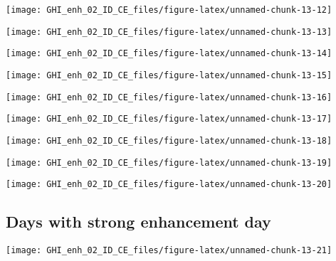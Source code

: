 \documentclass[
  10pt,
  a4paper,oneside]{article}
\begin{document}
\begin{center}\texttt{[image: GHI\_enh\_02\_ID\_CE\_files/figure-latex/unnamed-chunk-13-12]} \end{center}

\begin{center}\texttt{[image: GHI\_enh\_02\_ID\_CE\_files/figure-latex/unnamed-chunk-13-13]} \end{center}

\begin{center}\texttt{[image: GHI\_enh\_02\_ID\_CE\_files/figure-latex/unnamed-chunk-13-14]} \end{center}

\begin{center}\texttt{[image: GHI\_enh\_02\_ID\_CE\_files/figure-latex/unnamed-chunk-13-15]} \end{center}

\begin{center}\texttt{[image: GHI\_enh\_02\_ID\_CE\_files/figure-latex/unnamed-chunk-13-16]} \end{center}

\begin{center}\texttt{[image: GHI\_enh\_02\_ID\_CE\_files/figure-latex/unnamed-chunk-13-17]} \end{center}

\begin{center}\texttt{[image: GHI\_enh\_02\_ID\_CE\_files/figure-latex/unnamed-chunk-13-18]} \end{center}

\begin{center}\texttt{[image: GHI\_enh\_02\_ID\_CE\_files/figure-latex/unnamed-chunk-13-19]} \end{center}

\begin{center}\texttt{[image: GHI\_enh\_02\_ID\_CE\_files/figure-latex/unnamed-chunk-13-20]} \end{center}

\FloatBarrier

\hypertarget{days-with-strong-enhancement-day}{%
\subsection{Days with strong enhancement day}\label{days-with-strong-enhancement-day}}

\begin{center}\texttt{[image: GHI\_enh\_02\_ID\_CE\_files/figure-latex/unnamed-chunk-13-21]} \end{center}
\end{document}
